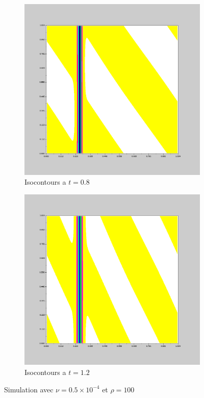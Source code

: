 \documentclass{article}
\begin{document}
\begin{figure}
	\begin{subfigure}{0.3\textwidth}
		\includegraphics[width=\textwidth]{isocontours_simu_2_0,8.png}
		\caption{Isocontours a $t=0.8$}
	\end{subfigure}
	\begin{subfigure}{0.3\textwidth}
		\includegraphics[width=\textwidth]{isocontours_simu_2_1,2.png}
		\caption{Isocontours a $t=1.2$}
	\end{subfigure}
	\caption{Simulation avec $\nu=0.5\times10^{-4}$ et $\rho=100$}\label{fig:sim2}
\end{figure}
\end{document}
